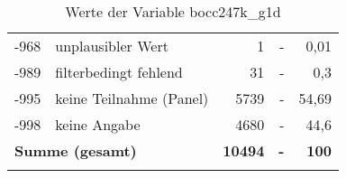 \begin{longtable}{Xlrrr}
       -968 & unplausibler Wert & 1 & - & 0,01 \\

       -989 & filterbedingt fehlend & 31 & - & 0,3 \\

       -995 & keine Teilnahme (Panel) & 5739 & - & 54,69 \\

       -998 & keine Angabe & 4680 & - & 44,6 \\

     \midrule
     \multicolumn{2}{l}{\textbf{Summe (gesamt)}} & \textbf{10494} & \textbf{-} & \textbf{100} \\
     \bottomrule
     \caption{Werte der Variable bocc247k\_g1d}
     \end{longtable}
     
